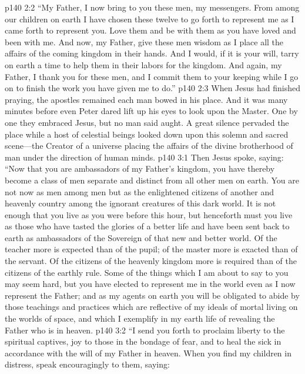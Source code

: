 \vs p140 2:2 \textcolor{ubdarkred}{“My Father, I now bring to you these men, my messengers. From among our children on earth I have chosen these twelve to go forth to represent me as I came forth to represent you. Love them and be with them as you have loved and been with me. And now, my Father, give these men wisdom as I place all the affairs of the coming kingdom in their hands. And I would, if it is your will, tarry on earth a time to help them in their labors for the kingdom. And again, my Father, I thank you for these men, and I commit them to your keeping while I go on to finish the work you have given me to do.”}
\pc \vs p140 2:3 When Jesus had finished praying, the apostles remained each man bowed in his place. And it was many minutes before even Peter dared lift up his eyes to look upon the Master. One by one they embraced Jesus, but no man said aught. A great silence pervaded the place while a host of celestial beings looked down upon this solemn and sacred scene---the Creator of a universe placing the affairs of the divine brotherhood of man under the direction of human minds.
\vs p140 3:1 Then Jesus spoke, saying: \textcolor{ubdarkred}{“Now that you are ambassadors of my Father’s kingdom, you have thereby become a class of men separate and distinct from all other men on earth. You are not now as men among men but as the enlightened citizens of another and heavenly country among the ignorant creatures of this dark world. It is not enough that you live as you were before this hour, but henceforth must you live as those who have tasted the glories of a better life and have been sent back to earth as ambassadors of the Sovereign of that new and better world. Of the teacher more is expected than of the pupil; of the master more is exacted than of the servant. Of the citizens of the heavenly kingdom more is required than of the citizens of the earthly rule. Some of the things which I am about to say to you may seem hard, but you have elected to represent me in the world even as I now represent the Father; and as my agents on earth you will be obligated to abide by those teachings and practices which are reflective of my ideals of mortal living on the worlds of space, and which I exemplify in my earth life of revealing the Father who is in heaven.}
\vs p140 3:2 \textcolor{ubdarkred}{“I send you forth to proclaim liberty to the spiritual captives, joy to those in the bondage of fear, and to heal the sick in accordance with the will of my Father in heaven. When you find my children in distress, speak encouragingly to them, saying:}

